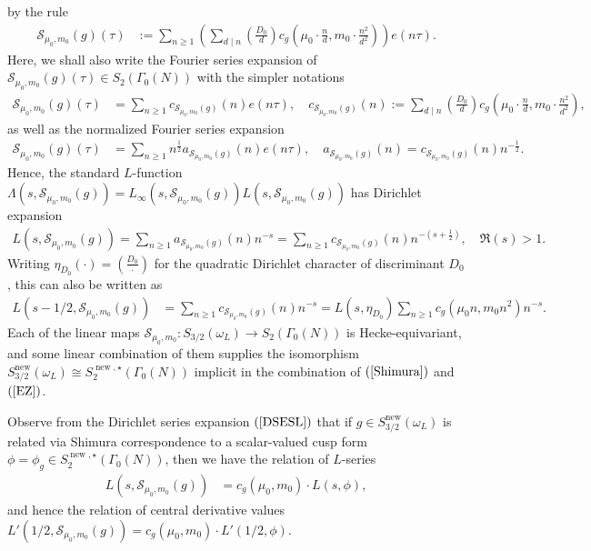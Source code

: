 \documentclass{amsart}
\theoremstyle{definition}
\theoremstyle{definition}
\theoremstyle{definition}
\begin{document}
by the rule 
\begin{align*}\mathcal{S}_{\mu_0, m_0}(g)(\tau) &:= \sum\limits_{n \geq 1} \left(  \sum\limits_{d \mid n} \left( \frac{D_0}{d} \right)   
c_g \left(  \mu_0 \cdot \frac{n}{d}, m_0 \cdot \frac{n^2}{d^2}  \right)  \right) e(n \tau). \end{align*} 
Here, we shall also write the Fourier series expansion of 
$\mathcal{S}_{\mu_0, m_0}(g)(\tau) \in S_2(\Gamma_0(N))$ with the simpler notations
\begin{align*} \mathcal{S}_{\mu_0, m_0}(g)(\tau) &= \sum\limits_{n \geq 1} c_{\mathcal{S}_{\mu_0, m_0}(g)}(n) e(n \tau),
\quad  c_{\mathcal{S}_{\mu_0, m_0}(g)}(n) := \sum\limits_{d \mid n} \left( \frac{D_0}{d} \right)  
c_g \left( \mu_0 \cdot \frac{n}{d}, m_0 \cdot \frac{n^2}{d^2}  \right),\end{align*}
as well as the normalized Fourier series expansion 
\begin{align*} \mathcal{S}_{\mu_0, m_0}(g)(\tau) &= \sum\limits_{n \geq 1} n^{\frac{1}{2}} a_{\mathcal{S}_{\mu_0, m_0}(g)}(n) e(n \tau), \quad 
a_{\mathcal{S}_{\mu_0, m_0}(g)}(n) = c_{\mathcal{S}_{\mu_0, m_0}(g)}(n) n^{-\frac{1}{2}}. \end{align*}
Hence, the standard $L$-function 
$\Lambda(s, \mathcal{S}_{\mu_0, m_0}(g)) = L_{\infty}(s, \mathcal{S}_{\mu_0, m_0}(g)) L(s, \mathcal{S}_{\mu_0, m_0}(g))$ has Dirichlet expansion 
\begin{align*} L(s, \mathcal{S}_{\mu_0, m_0}(g)) = \sum\limits_{n \geq 1} a_{ \mathcal{S}_{\mu_0, m_0}(g) }(n) n^{-s} 
= \sum\limits_{n \geq 1} c_{ \mathcal{S}_{\mu_0, m_0}(g) }(n) n^{-(s + \frac{1}{2})}, \quad \Re(s)>1. \end{align*}
Writing $\eta_{D_0}(\cdot) = \left( \frac{D_0}{\cdot} \right)$ for the quadratic Dirichlet character of discriminant $D_0$, this can also be written as 
\begin{align}\label{DSESL} L(s -1/2, \mathcal{S}_{\mu_0, m_0}(g)) &= \sum\limits_{n \geq 1} c_{\mathcal{S}_{\mu_0, m_0}(g)}(n) n^{-s} 
= L(s, \eta_{D_0}) \sum\limits_{n \geq 1} c_g(\mu_0 n, m_0 n^2 ) n^{-s}. \end{align}
Each of the linear maps $\mathcal{S}_{\mu_0, m_0}: S_{3/2}(\omega_L) \longrightarrow S_2(\Gamma_0(N))$ is Hecke-equivariant, 
and some linear combination of them supplies the isomorphism
$S_{3/2}^{\operatorname{new}}(\omega_L) \cong S_2^{\operatorname{new}, \star}(\Gamma_0(N))$
implicit in the combination of $(\ref{Shimura})$ and $(\ref{EZ})$. 

Observe from the Dirichlet series expansion $(\ref{DSESL})$ that if 
$g \in S_{3/2}^{\operatorname{new}}(\omega_L)$ is related via Shimura correspondence to a scalar-valued 
cusp form $\phi = \phi_g \in S_2^{\operatorname{new}, \star}(\Gamma_0(N))$, then we have the relation of $L$-series 
\begin{align}\label{RLS} L(s, \mathcal{S}_{\mu_0, m_0} (g) ) &= c_g (\mu_0, m_0) \cdot L(s, \phi), \end{align} 
and hence the relation of central derivative values $L'(1/2, \mathcal{S}_{\mu_0, m_0}(g) ) = c_g (\mu_0, m_0) \cdot L'(1/2, \phi)$.
\end{document}
